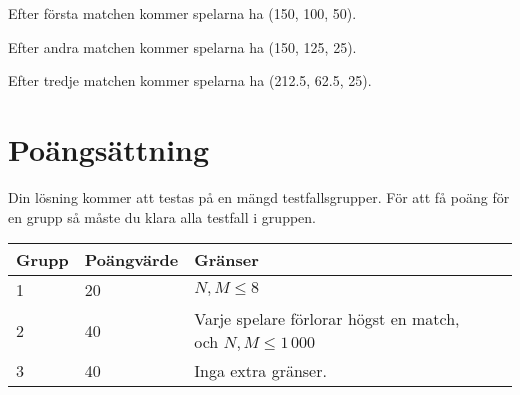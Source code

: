 Efter första matchen kommer spelarna ha (150, 100, 50).

Efter andra matchen kommer spelarna ha (150, 125, 25).

Efter tredje matchen kommer spelarna ha (212.5, 62.5, 25).

\section*{Poängsättning}
Din lösning kommer att testas på en mängd testfallsgrupper. För att få poäng
för en grupp så måste du klara alla testfall i gruppen.

\begin{tabular}{| l | l | l | l |}
\hline
Grupp & Poängvärde & Gränser    \\ \hline
1     & 20         & $N, M \le 8$ \\ \hline
2     & 40         & Varje spelare förlorar högst en match, och $N, M \le 1\,000$  \\ \hline
3     & 40         & Inga extra gränser. \\ \hline
\end{tabular}
